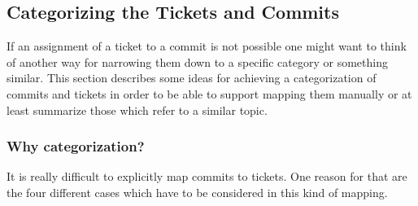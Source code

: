 \subsection{Categorizing the Tickets and Commits}

If an assignment of a ticket to a commit is not possible one might want to think of another way for narrowing them down to a specific category or something similar. This section describes some ideas for achieving a categorization of commits and tickets in order to be able to support mapping them manually or at least summarize those which refer to a similar topic.

\subsubsection{Why categorization?}

It is really difficult to explicitly map commits to tickets. One reason for that are the four different cases which have to be considered in this kind of mapping.\\

